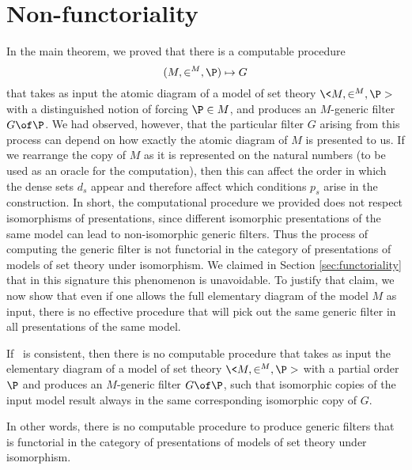 \documentclass{amsart}
\begin{document}
\section{Non-functoriality}\label{Section.Non-functoriality}
In the main theorem, we proved that there is a computable procedure
$$(M,\in^M,\P)\mapsto G$$
that takes as input the atomic diagram of a model of set theory $\<M,\in^M,\P>$ with a distinguished notion of forcing $\P\in M$, and produces an $M$-generic filter $G\of\P$. We had observed, however, that the particular filter $G$ arising from this process can depend on how exactly the atomic diagram of $M$ is presented to us. If we rearrange the copy of $M$ as it is represented on the natural numbers (to be used as an oracle for the computation), then this can affect the order in which the dense sets $d_s$ appear and therefore affect which conditions $p_s$ arise in the construction. In short, the computational procedure we provided does not respect isomorphisms of presentations, since different isomorphic presentations of the same model can lead to non-isomorphic generic filters. Thus the process of computing the generic filter is not functorial in the category of presentations of models of set theory under isomorphism.
We claimed in Section \ref{sec:functoriality} that in this signature this phenomenon is unavoidable. To justify that claim, we now show that even if one allows the full elementary diagram of the model $M$ as input, there is no effective procedure that will pick out the same generic filter in all presentations of the same model.
\begin{theorem}\label{Theorem.No-Turing-functor}
If \ZF\ is consistent, then there is no computable procedure that takes as input the elementary diagram of a model of set theory $\<M,\in^M,\P>$ with a partial order $\P$ and produces an $M$-generic filter $G\of \P$, such that isomorphic copies of the input model result always in the same corresponding isomorphic copy of $G$.
\end{theorem}
\noindent In other words, there is no computable procedure to produce generic filters that is functorial in the category of presentations of models of set theory under isomorphism.
\end{document}
